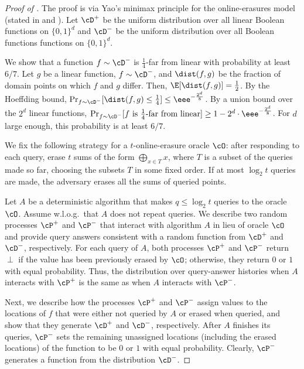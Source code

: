 \documentclass{toc}
\begin{document}
\begin{proof}[Proof of ] 
The proof is via Yao's minimax principle for the online-erasures model (stated in  and ).  
 Let $\cD^+$ be the uniform distribution over all linear Boolean functions on $\{0,1\}^d$ and  $\cD^{-}$ be the uniform distribution over all Boolean functions functions on $\{0,1\}^d$. 
 
 We show that a function $f \sim \cD^-$ is $\frac 1 4$-far from linear with probability at least $6/7$.
 Let $g$ be a linear function, $f \sim \cD^-$, and $\dist(f,g)$ be the fraction of domain points on which $f$ and $g$ differ. Then, $\E[\dist(f,g)] = \frac{1}{2}$. By the Hoeffding bound, $\Pr_{f\sim \cD^-}[\dist(f,g) \leq \frac{1}{4}] \leq \eee^{-\frac{2^d}{8}}$.
By a union bound over the $2^d$ linear functions, $\Pr_{f\sim \cD^-}[f \text{ is } \frac{1}{4}\textnormal{-far from linear}] \geq 1 - 2^d \cdot \eee^{-\frac{2^d}{8}}$. For $d$ large enough, this probability is at least $6/7$. 
 
We fix the following  strategy for a $t$-online-erasure oracle $\cO$: after responding to each query, erase $t$ sums of the form $\bigoplus_{x \in T}x$, where  $T$ is a subset of the queries made so far, choosing the subsets $T$ in some fixed order.
If at most $\log_2 t$ queries are made, the adversary erases all the sums of queried points.


 
 Let $A$ be a deterministic algorithm that makes $q \leq \log_2 t$ queries to the oracle $\cO$. Assume w.l.o.g.\ that $A$ does not repeat queries. 
 We describe two random processes $\cP^+$ and $\cP^-$ that interact with %
 algorithm $A$ in lieu of oracle $\cO$ and provide query answers consistent with a random function from $\cD^+$ and $\cD^-$, respectively. 
 For each query of $A$, both processes $\cP^+$ and $\cP^-$ return $\perp$ if the value has been previously erased by $\cO$; otherwise, they return $0$ or $1$ with equal probability. Thus, the distribution over query-answer histories when $A$ interacts with $\cP^+$ is the same as when $A$ interacts with $\cP^-$.  
 
Next, we describe how the processes $\cP^+$ and $\cP^-$ assign values to the locations of $f$ that were either not queried by $A$ or erased when queried, and show that they generate $\cD^+$ and $\cD^-$, respectively. 
%
After $A$ finishes its queries, $\cP^-$ sets the remaining unassigned locations (including the erased locations) of the function to be $0$ or $1$ with equal probability.  Clearly, $\cP^-$ generates a function from the distribution $\cD^-$. 
 

\end{proof}
\end{document}
